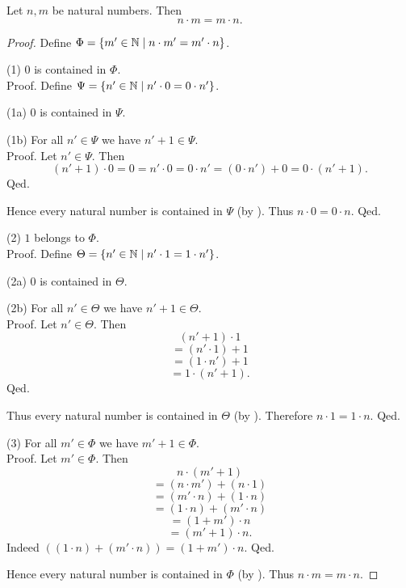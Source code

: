 \documentclass[10pt]{article}
\begin{document}
  \begin{forthel}
    \begin{proposition}
      Let $n, m$ be natural numbers.
      Then \[ n \cdot m = m \cdot n. \]
    \end{proposition}
    \begin{proof}
      Define $\Phi = \{ m' \in \mathbb{N} \mid n \cdot m' = m' \cdot n \}$.

      (1) $0$ is contained in $\Phi$. \\
      Proof.
        Define $\Psi = \{ n' \in \mathbb{N} \mid n' \cdot 0 = 0 \cdot n' \}$.

        (1a) $0$ is contained in $\Psi$.

        (1b) For all $n' \in \Psi$ we have $n' + 1 \in \Psi$. \\
        Proof.
          Let $n' \in \Psi$.
          Then
          \[ (n' + 1) \cdot 0
            = 0
            = n' \cdot 0
            = 0 \cdot n'
            = (0 \cdot n') + 0
            = 0 \cdot (n' + 1). \]
        Qed.

        Hence every natural number is contained in $\Psi$ (by ).
        Thus $n \cdot 0 = 0 \cdot n$.
      Qed.

      (2) $1$ belongs to $\Phi$. \\
      Proof.
        Define $\Theta = \{ n' \in \mathbb{N} \mid n' \cdot 1 = 1 \cdot n' \}$.

        (2a) $0$ is contained in $\Theta$.

        (2b) For all $n' \in \Theta$ we have $n' + 1 \in \Theta$. \\
        Proof.
          Let $n' \in \Theta$.
          Then
          \[  (n' + 1) \cdot 1        \]
          \[    = (n' \cdot 1) + 1    \]
          \[    = (1 \cdot n') + 1    \]
          \[    = 1 \cdot (n' + 1).   \]
        Qed.

        Thus every natural number is contained in $\Theta$ (by ).
        Therefore $n \cdot 1 = 1 \cdot n$.
      Qed.

      (3) For all $m' \in \Phi$ we have $m' + 1 \in \Phi$. \\
      Proof.
        Let $m' \in \Phi$.
        Then
        \[  n \cdot (m' + 1)                \]
        \[    = (n \cdot m') + (n \cdot 1)  \]
        \[    = (m' \cdot n) + (1 \cdot n)  \]
        \[    = (1 \cdot n) + (m' \cdot n)  \]
        \[    = (1 + m') \cdot n            \]
        \[    = (m' + 1) \cdot n.           \]
        Indeed $((1 \cdot n) + (m' \cdot n)) = (1 + m') \cdot n$. %
      Qed.

      Hence every natural number is contained in $\Phi$ (by ).
      Thus $n \cdot m = m \cdot n$.
    \end{proof}
  \end{forthel}
\end{document}
